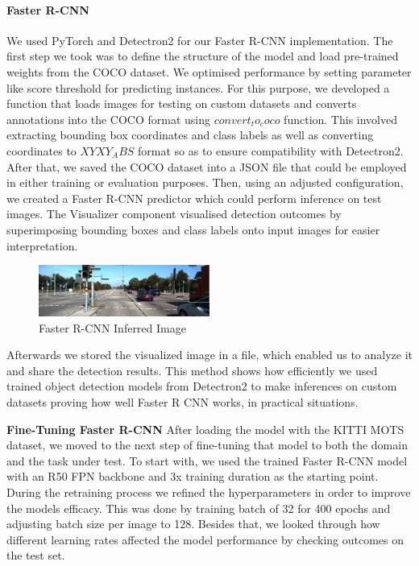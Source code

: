 \documentclass{IEEEtran}
\begin{document}
	\paragraph{Faster R-CNN}
	We used PyTorch and Detectron2 for our Faster R-CNN implementation. The first step we took was to define the structure of the model and load pre-trained weights from the COCO dataset. We optimised performance by setting parameter like score threshold for predicting instances. For this purpose, we developed a function that loads images for testing on custom datasets and converts annotations into the COCO format using $convert_to_coco$ function. This involved extracting bounding box coordinates and class labels as well as converting coordinates to $XYXY_ABS$ format so as to ensure compatibility with Detectron2. After that, we saved the COCO dataset into a JSON file that could be employed in either training or evaluation purposes. Then, using an adjusted configuration, we created a Faster R-CNN predictor which could perform inference on test images. The Visualizer component visualised detection outcomes by superimposing bounding boxes and class labels onto input images for easier interpretation.
	
	\begin{figure}[htbp]
		\centering
		\includegraphics[width=0.5\textwidth]{images/faster_inferred_image.jpg}
		\caption{Faster R-CNN Inferred Image}
		\label{fig:faster_inferred_image}
	\end{figure}
	
	Afterwards we stored the visualized image in a file, which enabled us to analyze it and share the detection results. This method shows how efficiently we used trained object detection models from Detectron2 to make inferences on custom datasets proving how well Faster R CNN works, in practical situations.
	
	\textbf{Fine-Tuning Faster R-CNN}
	After loading the model with the KITTI MOTS dataset, we moved to the next step of fine-tuning that model to both the domain and the task under test. To start with, we used the trained Faster R-CNN model with an R50 FPN backbone and 3x training duration as the starting point. During the retraining process we refined the hyperparameters in order to improve the models efficacy. This was done by training batch of 32 for 400 epochs and adjusting batch size per image to 128. Besides that, we looked through how different learning rates affected the model performance by checking outcomes on the test set.
	
\end{document}
